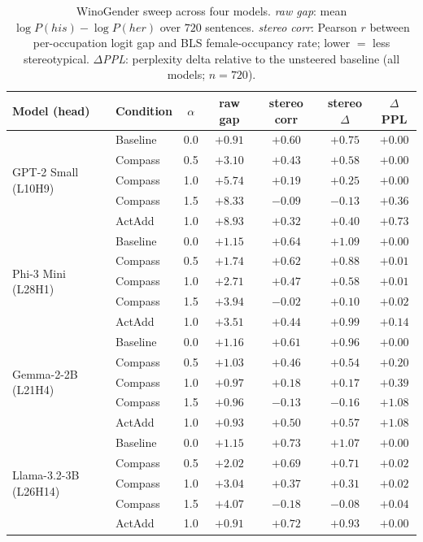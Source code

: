 \begin{table}[h]
\centering
\small
\caption{WinoGender sweep across four models. \emph{raw gap}:
mean $\log P(\mathit{his})-\log P(\mathit{her})$ over $720$ sentences.
\emph{stereo corr}: Pearson $r$ between per-occupation logit gap and
BLS female-occupancy rate; lower $=$ less stereotypical.
\emph{$\Delta$PPL}: perplexity delta relative to the unsteered baseline
(all models; $n = 720$).}
\label{tab:winogender}
\begin{tabular}{llccccc}
\toprule
Model (head) & Condition & $\alpha$ & raw gap & stereo corr & stereo $\Delta$ & $\Delta$PPL \\
\midrule
\multirow{5}{*}{GPT-2 Small (L10H9)}
& Baseline & 0.0  & $+0.91$ & $+0.60$ & $+0.75$ & $+0.00$ \\
& Compass  & 0.5  & $+3.10$ & $+0.43$ & $+0.58$ & $+0.00$ \\
& Compass  & 1.0  & $+5.74$ & $+0.19$ & $+0.25$ & $+0.00$ \\
& Compass  & 1.5  & $+8.33$ & $-0.09$ & $-0.13$ & $+0.36$ \\
& ActAdd   & 1.0  & $+8.93$ & $+0.32$ & $+0.40$ & $+0.73$ \\
\midrule
\multirow{5}{*}{Phi-3 Mini (L28H1)}
& Baseline & 0.0  & $+1.15$ & $+0.64$ & $+1.09$ & $+0.00$ \\
& Compass  & 0.5  & $+1.74$ & $+0.62$ & $+0.88$ & $+0.01$ \\
& Compass  & 1.0  & $+2.71$ & $+0.47$ & $+0.58$ & $+0.01$ \\
& Compass  & 1.5  & $+3.94$ & $-0.02$ & $+0.10$ & $+0.02$ \\
& ActAdd   & 1.0  & $+3.51$ & $+0.44$ & $+0.99$ & $+0.14$ \\
\midrule
\multirow{5}{*}{Gemma-2-2B (L21H4)}
& Baseline & 0.0  & $+1.16$ & $+0.61$ & $+0.96$ & $+0.00$ \\
& Compass  & 0.5  & $+1.03$ & $+0.46$ & $+0.54$ & $+0.20$ \\
& Compass  & 1.0  & $+0.97$ & $+0.18$ & $+0.17$ & $+0.39$ \\
& Compass  & 1.5  & $+0.96$ & $-0.13$ & $-0.16$ & $+1.08$ \\
& ActAdd   & 1.0  & $+0.93$ & $+0.50$ & $+0.57$ & $+1.08$ \\
\midrule
\multirow{5}{*}{Llama-3.2-3B (L26H14)}
& Baseline & 0.0  & $+1.15$ & $+0.73$ & $+1.07$ & $+0.00$ \\
& Compass  & 0.5  & $+2.02$ & $+0.69$ & $+0.71$ & $+0.02$ \\
& Compass  & 1.0  & $+3.04$ & $+0.37$ & $+0.31$ & $+0.02$ \\
& Compass  & 1.5  & $+4.07$ & $-0.18$ & $-0.08$ & $+0.04$ \\
& ActAdd   & 1.0  & $+0.91$ & $+0.72$ & $+0.93$ & $+0.00$ \\
\bottomrule
\end{tabular}
\end{table}

